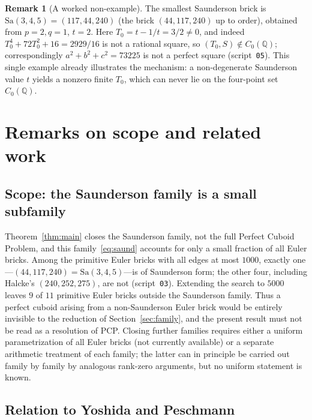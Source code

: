\documentclass[11pt,reqno]{amsart}
\theoremstyle{plain}
\theoremstyle{definition}
\newtheorem{remark}[theorem]{Remark}
\newcommand{\Q}{\mathbb{Q}}
\begin{document}
\begin{remark}[A worked non-example]
The smallest Saunderson brick is $\mathrm{Sa}(3,4,5)=(117,44,240)$ (the brick
$(44,117,240)$ up to order), obtained from $p=2,q=1$, $t=2$. Here
$T_0=t-1/t=3/2\neq0$, and indeed $T_0^4+72T_0^2+16=2929/16$ is not a rational
square, so $(T_0,S)\notin C_0(\Q)$; correspondingly $a^2+b^2+c^2=73225$ is not
a perfect square (script~\texttt{05}). This single example already illustrates
the mechanism: a non-degenerate Saunderson value $t$ yields a nonzero finite
$T_0$, which can never lie on the four-point set $C_0(\Q)$.
\end{remark}

\section{Remarks on scope and related work}\label{sec:remarks}

\subsection{Scope: the Saunderson family is a small subfamily}\label{sec:scope}

Theorem~\ref{thm:main} closes the Saunderson family, not the full
Perfect Cuboid Problem, and this family~\eqref{eq:saund} accounts for only
a small fraction of all Euler bricks. Among the primitive Euler bricks with all
edges at most $1000$, exactly one---$(44,117,240)=\mathrm{Sa}(3,4,5)$---is of
Saunderson form; the other four, including Halcke's $(240,252,275)$, are not
(script~\texttt{03}). Extending the search to $5000$ leaves $9$ of $11$
primitive Euler bricks outside the Saunderson family. Thus a perfect cuboid
arising from a non-Saunderson Euler brick would be entirely invisible to the
reduction of Section~\ref{sec:family}, and the present result must not be read
as a resolution of PCP. Closing further families requires either a uniform
parametrization of all Euler bricks (not currently available) or a separate
arithmetic treatment of each family; the latter can in principle be carried
out family by family by analogous rank-zero arguments, but no uniform
statement is known.

\subsection{Relation to Yoshida and Peschmann}\label{sec:related}
\end{document}
